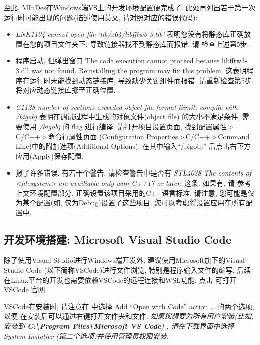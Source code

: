 至此, MInDes在Windows端VS上的开发环境配置便完成了. 此处再列出若干第一次运行时可能出现的问题(描述使用英文, 请对照对应的错误代码):
\begin{itemize}
      \item \emph{LNK1104 cannot open file `lib/x64/libfftw3-3.lib'} 表明您没有将静态库正确放置在您的项目文件夹下, 导致链接器找不到静态库而报错. 请
      检查上述第5步.
      \item 程序启动, 但弹出窗口{\sffamily{} The code execution cannot proceed because libfftw3-3.dll was not found. Reinstalling the program may fix this problem.}
      这表明程序在运行时未能找到动态链接库, 导致缺少关键组件而报错. 请重新检查第5步, 将对应动态链接库挪至正确位置.
      \item \emph{C1128 number of sections exceeded object file format liimit: compile with /bigobj} 表明在调试过程中生成的对象文件(object file)
      的大小不满足条件, 需要使用 \emph{/bigobj} 的 flag 进行编译. 请打开项目设置页面, 找到{\sffamily{}配置属性\,\textgreater\,C/C++\,\textgreater\,命令行属性页面
      (Configuration Properties\,\textgreater\,C/C++\,\textgreater\,Command Line)}中的{\sffamily{}附加选项(Additional Options)}, 在其中输入``/bigobj''
      后点击右下方{\sffamily{}应用(Apply)}保存配置.
      \item 报了许多错误, 有若干个警告. 请检查警告中是否有 \emph{STL4038 The contents of <filesystem> are availiable only with C++17 or later.} 这条. 如果有, 请
      参考上文环境配置部分, 正确设置该项目采用的C++语言标准. 请注意, 您可能是仅为某个配置(如, 仅为Debug)设置了这些项目. 您可以考虑将设置应用在所有配置中.
\end{itemize}

\subsection{开发环境搭建: Microsoft Visual Studio Code}
除了使用Visual Studio进行Windows端开发外, 建议使用Microsoft旗下的Visual Studio Code (以下简称VSCode)进行文件浏览,
特别是程序输入文件的编写. 后续在Linux平台的开发也需要依赖VSCode的远程连接和WSL功能. 点击
可打开 VSCode 官网.

VSCode在安装时, 请注意在 {} 中选择 {\sffamily Add ``Open with Code'' action \dots} 的两个选项, 以便
在安装后可以通过右键打开文件夹和文件. \emph{如果您想要为所有用户安装(比如, 安装到 \textbf{C:\textbackslash{Program Files\textbackslash{}Microsoft VS Code}})
, 请在下载界面中选择 {\sffamily{}System Installer} (第二个选项)并使用管理员权限安装}. 

